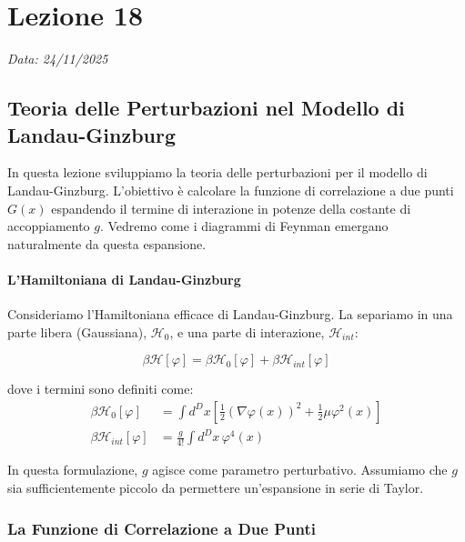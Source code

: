 \chapter{Lezione 18}
\label{chap:lezione_18}

\begin{flushright}
\textit{Data: 24/11/2025}
\end{flushright}

\section{Teoria delle Perturbazioni nel Modello di Landau-Ginzburg}

In questa lezione sviluppiamo la teoria delle perturbazioni per il modello di Landau-Ginzburg.
L'obiettivo è calcolare la funzione di correlazione a due punti $G(x)$ espandendo il termine di interazione in potenze della costante di accoppiamento $g$.
Vedremo come i diagrammi di Feynman emergano naturalmente da questa espansione.

\subsubsection{L'Hamiltoniana di Landau-Ginzburg}

Consideriamo l'Hamiltoniana efficace di Landau-Ginzburg. La separiamo in una parte libera (Gaussiana), $\mathcal{H}_0$, e una parte di interazione, $\mathcal{H}_{int}$:

\begin{equation}
    \beta \mathcal{H}[\varphi] = \beta \mathcal{H}_0[\varphi] + \beta \mathcal{H}_{int}[\varphi]
\end{equation}

dove i termini sono definiti come:
\begin{align}
    \beta \mathcal{H}_0[\varphi] &= \int d^D x \left[ \frac{1}{2} (\nabla \varphi(x))^2 + \frac{1}{2} \mu \varphi^2(x) \right] \\
    \beta \mathcal{H}_{int}[\varphi] &= \frac{g}{4!} \int d^D x \, \varphi^4(x)
\end{align}

In questa formulazione, $g$ agisce come parametro perturbativo.
Assumiamo che $g$ sia sufficientemente piccolo da permettere un'espansione in serie di Taylor.

\subsection{La Funzione di Correlazione a Due Punti}

